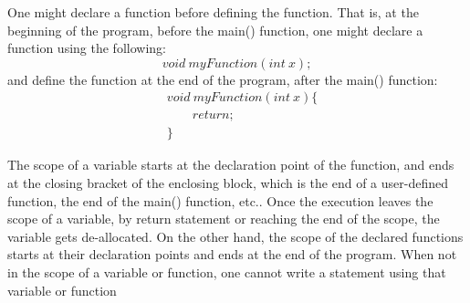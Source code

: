 \documentclass[11pt]{article}
\theoremstyle{break}
\theoremstyle{break}
\begin{document}
One might declare a function before defining the function. That is, at the beginning of the program, before the main() function, one might declare a function using the following:
$$void\ myFunction(int\ x);$$
and define the function at the end of the program, after the main() function:
\begin{align*}
&void\ myFunction(int\ x)\{\\
&\text{}\qquad return;\\
&\}
\end{align*}

The scope of a variable starts at the declaration point of the function, and ends at the closing bracket of the enclosing block, which is the end of a user-defined function, the end of the main() function, etc.. Once the execution leaves the scope of a variable, by return statement or reaching the end of the scope, the variable gets de-allocated. On the other hand, the scope of the declared functions starts at their declaration points and ends at the end of the program. When not in the scope of a variable or function, one cannot write a statement using that variable or function\\ 
\end{document}
